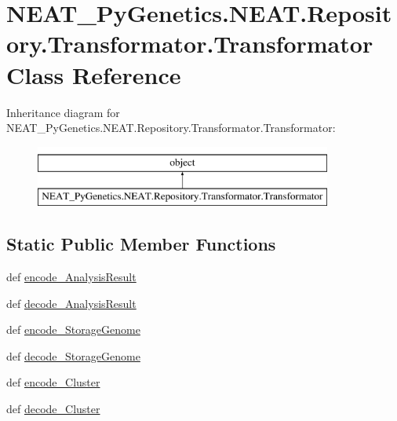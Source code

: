 \hypertarget{classNEAT__PyGenetics_1_1NEAT_1_1Repository_1_1Transformator_1_1Transformator}{}\section{N\+E\+A\+T\+\_\+\+Py\+Genetics.\+N\+E\+A\+T.\+Repository.\+Transformator.\+Transformator Class Reference}
\label{classNEAT__PyGenetics_1_1NEAT_1_1Repository_1_1Transformator_1_1Transformator}
Inheritance diagram for N\+E\+A\+T\+\_\+\+Py\+Genetics.\+N\+E\+A\+T.\+Repository.\+Transformator.\+Transformator\+:\begin{figure}[H]
\begin{center}
\leavevmode
\includegraphics[height=2.000000cm]{classNEAT__PyGenetics_1_1NEAT_1_1Repository_1_1Transformator_1_1Transformator}
\end{center}
\end{figure}
\subsection*{Static Public Member Functions}
\begin{DoxyCompactItemize}
\item 
def \hyperlink{classNEAT__PyGenetics_1_1NEAT_1_1Repository_1_1Transformator_1_1Transformator_a930f3a38fe7754c4c4a950718cf6df99}{encode\+\_\+\+Analysis\+Result}
\item 
def \hyperlink{classNEAT__PyGenetics_1_1NEAT_1_1Repository_1_1Transformator_1_1Transformator_afa3d18da2509741c7b98b86f6b867c93}{decode\+\_\+\+Analysis\+Result}
\item 
def \hyperlink{classNEAT__PyGenetics_1_1NEAT_1_1Repository_1_1Transformator_1_1Transformator_a5c4155f4acbb4c8cf532e1fccc9b2e47}{encode\+\_\+\+Storage\+Genome}
\item 
def \hyperlink{classNEAT__PyGenetics_1_1NEAT_1_1Repository_1_1Transformator_1_1Transformator_acc9bbdb90961f5952e142967fadb8792}{decode\+\_\+\+Storage\+Genome}
\item 
def \hyperlink{classNEAT__PyGenetics_1_1NEAT_1_1Repository_1_1Transformator_1_1Transformator_ae51de8a47210d94df0d81d170cd81998}{encode\+\_\+\+Cluster}
\item 
def \hyperlink{classNEAT__PyGenetics_1_1NEAT_1_1Repository_1_1Transformator_1_1Transformator_a8671f5ca051f20dbdd948c8689a6019c}{decode\+\_\+\+Cluster}
\end{DoxyCompactItemize}


